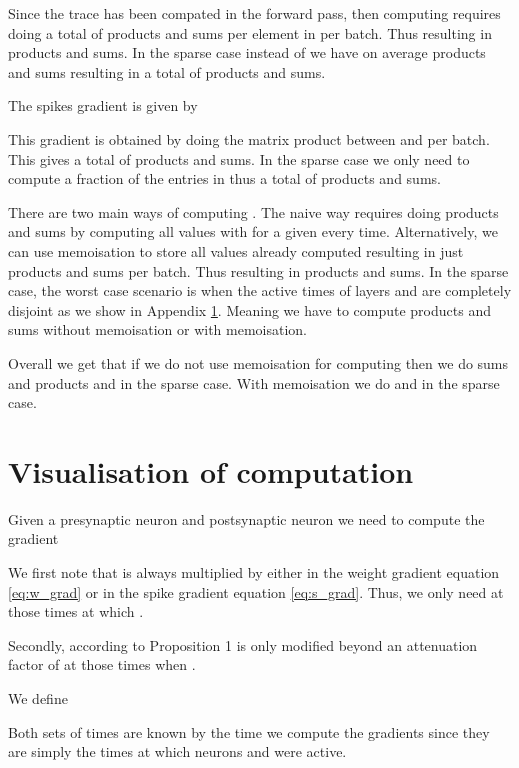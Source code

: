 \documentclass{article}
\begin{document}
Since the trace  has been compated in the forward pass, then computing  requires doing a total of  products and  sums per element in  per batch. Thus resulting in  products and  sums. In the sparse case instead of  we have on average  products and  sums resulting in a total of   products and  sums.

The spikes gradient is given by



This gradient is obtained by doing the matrix product between  and  per batch. This gives a total of  products and sums. In the sparse case we only need to compute a fraction  of the entries in  thus a total of  products and sums.

There are two main ways of computing . The naive way requires doing  products and  sums by computing all values with  for a given  every time. Alternatively, we can use memoisation to store all values already computed resulting in just  products and  sums per batch. Thus resulting in  products and sums. In the sparse case, the worst case scenario is when the active times of layers  and  are completely disjoint as we show in Appendix \ref{supp:delta_vis}. Meaning we have to compute  products and sums without memoisation or  with memoisation.

Overall we get that if we do not use memoisation for computing  then we do  sums and products and  in the sparse case. With memoisation we do  and  in the sparse case.


\section{Visualisation of  computation} \label{supp:delta_vis}

Given a presynaptic neuron  and postsynaptic neuron  we need to compute the gradient



We first note that  is always multiplied by  either in the weight gradient equation \eqref{eq:w_grad} or in the spike gradient equation \eqref{eq:s_grad}. Thus, we only need  at those times at which . 

Secondly, according to Proposition 1   is only modified beyond an attenuation factor of  at those times when . 

We define 



Both sets of times are known by the time we compute the gradients since they are simply the times at which neurons  and  were active.
\end{document}
